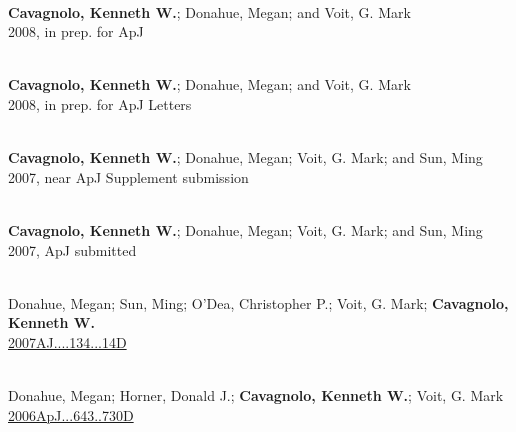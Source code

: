 \documentclass[11pt]{cv}
\begin{document}
\begin{llist}


{}\\
{\bf Cavagnolo, Kenneth W.}; Donahue, Megan; and Voit, G. Mark\\
2008, in prep. for ApJ

{}\\
{\bf Cavagnolo, Kenneth W.}; Donahue, Megan; and Voit, G. Mark\\
2008, in prep. for ApJ Letters

{}\\
{\bf Cavagnolo, Kenneth W.}; Donahue, Megan; Voit, G. Mark; and Sun, Ming\\
2007, near ApJ Supplement submission

{}\\
{\bf Cavagnolo, Kenneth W.}; Donahue, Megan; Voit, G. Mark; and Sun, Ming\\
2007, ApJ submitted



{}\\
Donahue, Megan; Sun, Ming; O'Dea, Christopher P.; Voit, G. Mark; {\bf Cavagnolo, Kenneth W.}\\
\href{http://adsabs.harvard.edu/abs/2007AJ....134...14D}{2007AJ....134...14D}

{}\\
Donahue, Megan; Horner, Donald J.; {\bf Cavagnolo, Kenneth W.}; Voit, G. Mark\\
\href{http://adsabs.harvard.edu/abs/2006ApJ...643..730D}{2006ApJ...643..730D}


\end{llist}
\end{document}

